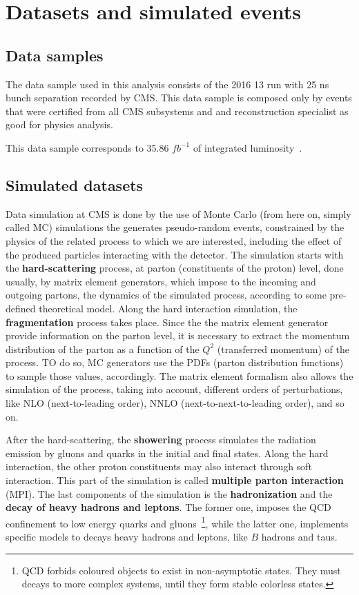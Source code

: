 \section{Datasets and simulated events} \label{datasets_and_MC_samples}

\subsection{Data samples}

The data sample used in this analysis consists of the 2016 13 \TeV run
with 25 ns bunch separation recorded by CMS. This data sample is composed only by events that were certified from all CMS subsystems and and reconstruction specialist as good for physics analysis.

This data sample corresponds to 35.86 $fb^{-1}$ of integrated luminosity~\cite{CMS-PAS-LUM-17-001}.

\subsection{Simulated datasets}
\label{sec:datasets}

Data simulation at CMS is done by the use of Monte Carlo (from here on, simply called MC) simulations the generates pseudo-random events, constrained by the physics of the related process to which we are interested, including the effect of the produced particles interacting with the detector. The simulation starts with the \textbf{hard-scattering} process, at parton (constituents of the proton) level, done usually, by matrix element generators, which impose to the incoming and outgoing partons, the dynamics of the simulated process, according to some pre-defined theoretical model. Along the hard interaction simulation, the \textbf{fragmentation} process takes place. Since the the matrix element generator provide information on the parton level, it is necessary to extract the momentum distribution of the parton as a function of the $Q^2$ (transferred momentum) of the process. TO do so, MC generators use the PDFs (parton distribution functions) to sample those values, accordingly. The matrix element formalism also allows the simulation of the process, taking into account, different orders of perturbations, like NLO (next-to-leading order), NNLO (next-to-next-to-leading order), and so on.

After the hard-scattering, the \textbf{showering} process simulates the radiation emission by gluons and quarks in the initial and final states. Along the hard interaction, the other proton constituents may also interact through soft interaction. This part of the simulation is called \textbf{multiple parton interaction} (MPI). The last components of the simulation is the \textbf{hadronization} and the \textbf{decay of heavy hadrons and leptons}. The former one, imposes the QCD confinement to low energy quarks and gluons~\footnote{QCD forbids coloured objects to exist in non-asymptotic states. They must decays to more complex systems, until they form stable colorless states.}, while the latter one, implements specific models to decays heavy hadrons and leptons, like $B$ hadrons and taus.

